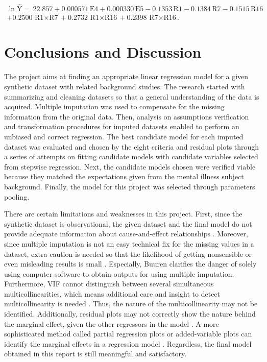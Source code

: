 \documentclass[11pt]{article}
\begin{document}
\begin{multline}\label{eq:model}
\ln{\hat{\textrm{Y}}}=\,22.857+0.000571\,\textrm{E4}+0.000330\,\textrm{E5}-0.1353\,\textrm{R1}-0.1384\,\textrm{R7}-0.1515\,\textrm{R16}\\
+0.2500\,\textrm{R1$\times$R7}+0.2732\,\textrm{R1$\times$R16}+0.2398\,\textrm{R7$\times$R16}.
\end{multline}

\section{Conclusions and Discussion}
The project aims at finding an appropriate linear regression model for a given synthetic dataset with related background studies. The research started with summarizing and cleaning datasets so that a general understanding of the data is acquired. Multiple imputation was used to compensate for the missing information from the original data. Then, analysis on assumptions verification and transformation procedures for imputed datasets enabled to perform an unbiased and correct regression. The best candidate model for each imputed dataset was evaluated and chosen by the eight criteria and residual plots through a series of attempts on fitting candidate models with candidate variables selected from stepwise regression. Next, the candidate models chosen were verified viable because they matched the expectations given from the mental illness subject background. Finally, the model for this project was selected through parameters pooling.

There are certain limitations and weaknesses in this project. First, since the synthetic dataset is observational, the given dataset and the final model do not provide adequate information about cause-and-effect relationships \cite{bk:kutner, bk:montgomery}. Moreover, since multiple imputation is not an easy technical fix for the missing values in a dataset, extra caution is needed so that the likelihood of getting nonsensible or even misleading results is small \cite{bk:buuren}. Especially, Buuren \cite{bk:buuren} clarifies the danger of solely using computer software to obtain outputs for using multiple imputation. Furthermore, VIF cannot distinguish between several simultaneous multicollinearities, which means additional care and insight to detect multicollinearity is needed \cite{bk:kutner, bk:montgomery}. Thus, the nature of the multicollinearity may not be identified. Additionally, residual plots may not correctly show the nature behind the marginal effect, given the other regressors in the model \cite{bk:kutner}. A more sophisticated method called partial regression plots or added-variable plots can identify the marginal effects in a regression model \cite{bk:kutner, bk:montgomery}. Regardless, the final model obtained in this report is still meaningful and satisfactory.
\end{document}
